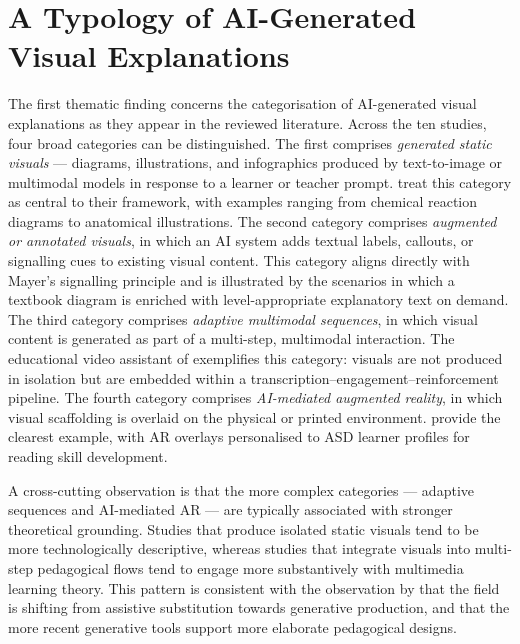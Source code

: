 \section{A Typology of AI-Generated Visual Explanations}

The first thematic finding concerns the categorisation of AI-generated visual explanations as they appear in the reviewed literature. Across the ten studies, four broad categories can be distinguished. The first comprises \emph{generated static visuals} --- diagrams, illustrations, and infographics produced by text-to-image or multimodal models in response to a learner or teacher prompt. \citet{bewersdorff2024} treat this category as central to their framework, with examples ranging from chemical reaction diagrams to anatomical illustrations. The second category comprises \emph{augmented or annotated visuals}, in which an AI system adds textual labels, callouts, or signalling cues to existing visual content. This category aligns directly with Mayer's signalling principle and is illustrated by the \citet{bewersdorff2024} scenarios in which a textbook diagram is enriched with level-appropriate explanatory text on demand. The third category comprises \emph{adaptive multimodal sequences}, in which visual content is generated as part of a multi-step, multimodal interaction. The educational video assistant of \citet{osman2024} exemplifies this category: visuals are not produced in isolation but are embedded within a transcription--engagement--reinforcement pipeline. The fourth category comprises \emph{AI-mediated augmented reality}, in which visual scaffolding is overlaid on the physical or printed environment. \citet{khoirunnisa2024} provide the clearest example, with AR overlays personalised to ASD learner profiles for reading skill development.

A cross-cutting observation is that the more complex categories --- adaptive sequences and AI-mediated AR --- are typically associated with stronger theoretical grounding. Studies that produce isolated static visuals tend to be more technologically descriptive, whereas studies that integrate visuals into multi-step pedagogical flows tend to engage more substantively with multimedia learning theory. This pattern is consistent with the observation by \citet{drosos2025} that the field is shifting from assistive substitution towards generative production, and that the more recent generative tools support more elaborate pedagogical designs.

